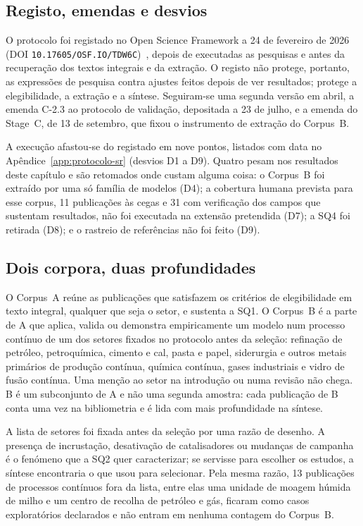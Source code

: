 \subsection{Registo, emendas e desvios}

O protocolo foi registado no Open Science Framework a 24 de fevereiro de
2026 (DOI \nolinkurl{10.17605/OSF.IO/TDW6C})~\cite{Ribeiro2026Protocolo},
depois de executadas as pesquisas e antes da recuperação dos textos
integrais e da extração. O registo não protege, portanto, as expressões de
pesquisa contra ajustes feitos depois de ver resultados; protege a
elegibilidade, a extração e a síntese. Seguiram-se uma segunda versão em
abril, a emenda C-2.3 ao protocolo de validação, depositada a 23 de julho,
e a emenda do Stage~C, de 13 de setembro, que fixou o instrumento de
extração do Corpus~B.

A execução afastou-se do registado em nove pontos, listados com data no
Apêndice~\ref{app:protocolo-sr} (desvios D1 a
D9). Quatro pesam nos
resultados deste capítulo e são retomados onde custam alguma coisa: o
Corpus~B foi extraído por uma só família de modelos (D4); a cobertura
humana prevista para esse corpus, 11 publicações às cegas e 31 com
verificação dos campos que sustentam resultados, não foi executada na extensão pretendida (D7);
a SQ4 foi retirada (D8); e o rastreio de referências não foi feito (D9).

\subsection{Dois corpora, duas profundidades}
\label{sec:dois-corpora}

O Corpus~A reúne as publicações que satisfazem os critérios de
elegibilidade em texto integral, qualquer que seja o setor, e sustenta a
SQ1. O Corpus~B é a parte de A que aplica, valida ou demonstra
empiricamente um modelo num processo contínuo de um dos setores fixados
no protocolo antes da seleção: refinação de petróleo, petroquímica,
cimento e cal, pasta e papel, siderurgia e outros metais primários de
produção contínua, química contínua, gases industriais e vidro de fusão
contínua. Uma menção ao setor na introdução ou numa revisão não chega.
B é um subconjunto de A e não uma segunda amostra: cada publicação de B
conta uma vez na bibliometria e é lida com mais profundidade na síntese.

A lista de setores foi fixada antes da seleção por uma razão de desenho.
A presença de incrustação, desativação de catalisadores ou mudanças de
campanha é o fenómeno que a SQ2 quer caracterizar; se servisse para
escolher os estudos, a síntese encontraria o que usou para selecionar.
Pela mesma razão, 13 publicações de processos contínuos fora da lista,
entre elas uma unidade de moagem húmida de milho e um centro de recolha
de petróleo e gás, ficaram como casos exploratórios declarados e não
entram em nenhuma contagem do Corpus~B.

